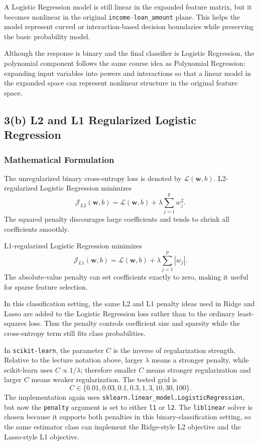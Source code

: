 \documentclass[12pt]{article}
\begin{document}
A Logistic Regression model is still linear in the expanded feature matrix, but it becomes nonlinear in the original \texttt{income}--\texttt{loan\_amount} plane. This helps the model represent curved or interaction-based decision boundaries while preserving the basic probability model.

Although the response is binary and the final classifier is Logistic Regression, the polynomial component follows the same course idea as Polynomial Regression: expanding input variables into powers and interactions so that a linear model in the expanded space can represent nonlinear structure in the original feature space.

\subsection{3(b) L2 and L1 Regularized Logistic Regression}

\subsubsection{Mathematical Formulation}

The unregularized binary cross-entropy loss is denoted by $\mathcal{L}(\mathbf{w},b)$. L2-regularized Logistic Regression minimizes
\[
    \mathcal{J}_{L2}(\mathbf{w},b)
    =
    \mathcal{L}(\mathbf{w},b)
    +
    \lambda\sum_{j=1}^{p}w_j^2.
\]
The squared penalty discourages large coefficients and tends to shrink all coefficients smoothly.

L1-regularized Logistic Regression minimizes
\[
    \mathcal{J}_{L1}(\mathbf{w},b)
    =
    \mathcal{L}(\mathbf{w},b)
    +
    \lambda\sum_{j=1}^{p}|w_j|.
\]
The absolute-value penalty can set coefficients exactly to zero, making it useful for sparse feature selection.

In this classification setting, the same L2 and L1 penalty ideas used in Ridge and Lasso are added to the Logistic Regression loss rather than to the ordinary least-squares loss. Thus the penalty controls coefficient size and sparsity while the cross-entropy term still fits class probabilities.

In \texttt{scikit-learn}, the parameter $C$ is the inverse of regularization strength. Relative to the lecture notation above, larger $\lambda$ means a stronger penalty, while scikit-learn uses $C \propto 1/\lambda$; therefore smaller $C$ means stronger regularization and larger $C$ means weaker regularization. The tested grid is
\[
    C \in \{0.01,0.03,0.1,0.3,1,3,10,30,100\}.
\]
The implementation again uses \texttt{sklearn.linear\_model.LogisticRegression}, but now the \texttt{penalty} argument is set to either \texttt{l1} or \texttt{l2}. The \texttt{liblinear} solver is chosen because it supports both penalties in this binary-classification setting, so the same estimator class can implement the Ridge-style L2 objective and the Lasso-style L1 objective.
\end{document}
